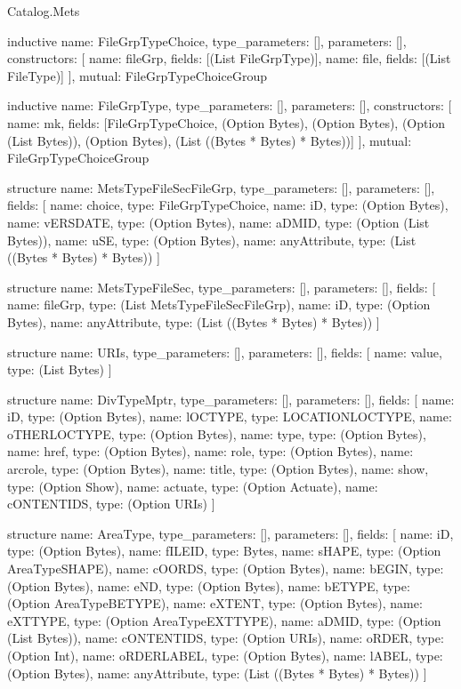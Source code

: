 \begin{lexlean}{Catalog.Mets}
\begin{semanticmodule}
inductive{
  name: FileGrpTypeChoice,
  type_parameters: [],
  parameters: [],
  constructors: [
    {name: fileGrp, fields: [(List FileGrpType)]},
    {name: file, fields: [(List FileType)]}
  ],
  mutual: FileGrpTypeChoiceGroup
}

inductive{
  name: FileGrpType,
  type_parameters: [],
  parameters: [],
  constructors: [
    {name: mk, fields: [FileGrpTypeChoice, (Option Bytes), (Option Bytes), (Option (List Bytes)), (Option Bytes), (List ((Bytes * Bytes) * Bytes))]}
  ],
  mutual: FileGrpTypeChoiceGroup
}

structure{
  name: MetsTypeFileSecFileGrp,
  type_parameters: [],
  parameters: [],
  fields: [
    {name: choice, type: FileGrpTypeChoice},
    {name: iD, type: (Option Bytes)},
    {name: vERSDATE, type: (Option Bytes)},
    {name: aDMID, type: (Option (List Bytes))},
    {name: uSE, type: (Option Bytes)},
    {name: anyAttribute, type: (List ((Bytes * Bytes) * Bytes))}
  ]
}

structure{
  name: MetsTypeFileSec,
  type_parameters: [],
  parameters: [],
  fields: [
    {name: fileGrp, type: (List MetsTypeFileSecFileGrp)},
    {name: iD, type: (Option Bytes)},
    {name: anyAttribute, type: (List ((Bytes * Bytes) * Bytes))}
  ]
}

structure{
  name: URIs,
  type_parameters: [],
  parameters: [],
  fields: [
    {name: value, type: (List Bytes)}
  ]
}

structure{
  name: DivTypeMptr,
  type_parameters: [],
  parameters: [],
  fields: [
    {name: iD, type: (Option Bytes)},
    {name: lOCTYPE, type: LOCATIONLOCTYPE},
    {name: oTHERLOCTYPE, type: (Option Bytes)},
    {name: type, type: (Option Bytes)},
    {name: href, type: (Option Bytes)},
    {name: role, type: (Option Bytes)},
    {name: arcrole, type: (Option Bytes)},
    {name: title, type: (Option Bytes)},
    {name: show, type: (Option Show)},
    {name: actuate, type: (Option Actuate)},
    {name: cONTENTIDS, type: (Option URIs)}
  ]
}

structure{
  name: AreaType,
  type_parameters: [],
  parameters: [],
  fields: [
    {name: iD, type: (Option Bytes)},
    {name: fILEID, type: Bytes},
    {name: sHAPE, type: (Option AreaTypeSHAPE)},
    {name: cOORDS, type: (Option Bytes)},
    {name: bEGIN, type: (Option Bytes)},
    {name: eND, type: (Option Bytes)},
    {name: bETYPE, type: (Option AreaTypeBETYPE)},
    {name: eXTENT, type: (Option Bytes)},
    {name: eXTTYPE, type: (Option AreaTypeEXTTYPE)},
    {name: aDMID, type: (Option (List Bytes))},
    {name: cONTENTIDS, type: (Option URIs)},
    {name: oRDER, type: (Option Int)},
    {name: oRDERLABEL, type: (Option Bytes)},
    {name: lABEL, type: (Option Bytes)},
    {name: anyAttribute, type: (List ((Bytes * Bytes) * Bytes))}
  ]
}


\end{semanticmodule}
\end{lexlean}
